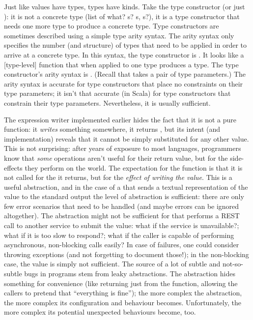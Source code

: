 \documentclass[10 pt]{article}
\begin{document}
Just like values have types, types have kinds. Take the type constructor  (or just ): it is not a concrete type (list of what? s? s, s?), it is a type constructor that needs one more type to produce a concrete type. Type constructors are sometimes described using a simple type arity syntax. The arity syntax only specifies the number (and structure) of types that need to be applied in order to arrive at a concrete type. In this syntax, the  type constructor is \pcode{* -> *}. It looks like a [type-level] function that when applied to one type produces a type. The  type constructor's arity syntax is \pcode{(*, *) -> *}. (Recall that  takes a pair of type parameters.) The arity syntax is accurate for type constructors that place no constraints on their type parameters; it isn't that accurate (in Scala) for type constructors that constrain their type parameters. Nevertheless, it is usually sufficient.

The expression writer implemented earlier hides the fact that it is not a pure function: it \emph{writes} something somewhere, it returns , but its intent (and implementation) reveals that it cannot be simply substituted for any other \pcode{()} value. This is not surprising: after years of exposure to most languages, programmers know that \emph{some} operations aren't useful for their return value, but for the side-effects they perform on the world. The expectation for the  function is that it is not called for the \pcode{()} it returns, but for the \emph{effect of writing the value}. This is a useful abstraction, and in the case of a  that sends a textual representation of the value to the standard output the level of abstraction is sufficient: there are only few error scenarios that need to be handled (and maybe errors can be ignored altogether). The abstraction might not be sufficient for  that performs a REST call to another service to submit the value: what if the service is unavailable?; what if it is too slow to respond?; what if the caller is capable of performing asynchronous, non-blocking calls easily? In case of failures, one could consider throwing exceptions (and not forgetting to document those!); in the non-blocking case, the value \pcode{()} is simply not sufficient. The source of a lot of subtle and not-so-subtle bugs in programs stem from leaky abstractions. The abstraction hides something for convenience (like returning just \pcode{()} from the  function, allowing the callers to pretend that ``everything is fine''); the more complex the abstraction, the more complex its configuration and behaviour becomes. Unfortunately, the more complex its potential unexpected behaviours become, too.
\end{document}
